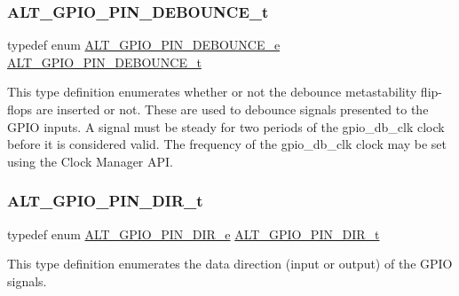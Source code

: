 \subsubsection{\texorpdfstring{ALT\_GPIO\_PIN\_DEBOUNCE\_t}{ALT\_GPIO\_PIN\_DEBOUNCE\_t}}
{\footnotesize\ttfamily typedef enum \mbox{\hyperlink{group__ALT__GPIO__API__CONFIG_ga0c161a7f66ca55815c2e41bb914ded83}{A\+L\+T\+\_\+\+G\+P\+I\+O\+\_\+\+P\+I\+N\+\_\+\+D\+E\+B\+O\+U\+N\+C\+E\+\_\+e}}  \mbox{\hyperlink{group__ALT__GPIO__API__CONFIG_gac48653c26697d3fd17d9029252655ac2}{A\+L\+T\+\_\+\+G\+P\+I\+O\+\_\+\+P\+I\+N\+\_\+\+D\+E\+B\+O\+U\+N\+C\+E\+\_\+t}}}

This type definition enumerates whether or not the debounce metastability flip-\/flops are inserted or not. These are used to debounce signals presented to the G\+P\+IO inputs. A signal must be steady for two periods of the gpio\+\_\+db\+\_\+clk clock before it is considered valid. The frequency of the gpio\+\_\+db\+\_\+clk clock may be set using the Clock Manager A\+PI. \mbox{\label{group__ALT__GPIO__API__CONFIG_ga96132f0cfe4bb0ffc0f9ec8a392a45f3}} 
\subsubsection{\texorpdfstring{ALT\_GPIO\_PIN\_DIR\_t}{ALT\_GPIO\_PIN\_DIR\_t}}
{\footnotesize\ttfamily typedef enum \mbox{\hyperlink{group__ALT__GPIO__API__CONFIG_ga788d8a869480b2f3743c8ba1c382df67}{A\+L\+T\+\_\+\+G\+P\+I\+O\+\_\+\+P\+I\+N\+\_\+\+D\+I\+R\+\_\+e}}  \mbox{\hyperlink{group__ALT__GPIO__API__CONFIG_ga96132f0cfe4bb0ffc0f9ec8a392a45f3}{A\+L\+T\+\_\+\+G\+P\+I\+O\+\_\+\+P\+I\+N\+\_\+\+D\+I\+R\+\_\+t}}}

This type definition enumerates the data direction (input or output) of the G\+P\+IO signals. \mbox{\label{group__ALT__GPIO__API__CONFIG_gac97da06ff658611bcd2b12753dfc4a10}} 
